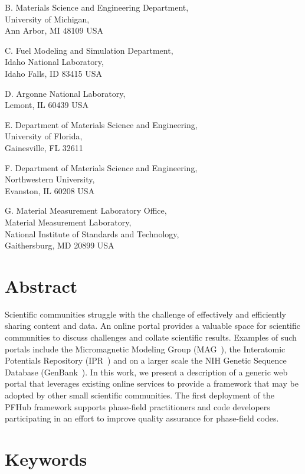 \documentclass{jors}
\begin{document}
B. Materials Science and Engineering Department, \\
University of Michigan, \\
Ann Arbor, MI 48109 USA

C. Fuel Modeling and Simulation Department, \\
Idaho National Laboratory, \\
Idaho Falls, ID 83415 USA

D. Argonne National Laboratory, \\
Lemont, IL 60439 USA

E. Department of Materials Science and Engineering, \\
University of Florida, \\
Gainesville, FL 32611

F. Department of Materials Science and Engineering, \\
Northwestern University, \\
Evanston, IL 60208 USA

G. Material Measurement Laboratory Office, \\
Material Measurement Laboratory, \\
National Institute of Standards and Technology,\\
Gaithersburg, MD 20899 USA


\section*{Abstract}

Scientific communities struggle with the challenge of effectively and
efficiently sharing content and data. An online portal provides a
valuable space for scientific communities to discuss challenges and
collate scientific results. Examples of such portals include the
Micromagnetic Modeling Group (\textmu MAG~\cite{mumag}), the Interatomic
Potentials Repository (IPR~\cite{ipr1, ipr2}) and on a larger scale
the NIH Genetic Sequence Database (GenBank~\cite{genbank}). In this
work, we present a description of a generic web portal that leverages
existing online services to provide a framework that may be adopted by
other small scientific communities. The first deployment of the PFHub
framework supports phase-field practitioners and code developers
participating in an effort to improve quality assurance for
phase-field codes.

\section*{Keywords}
\end{document}
